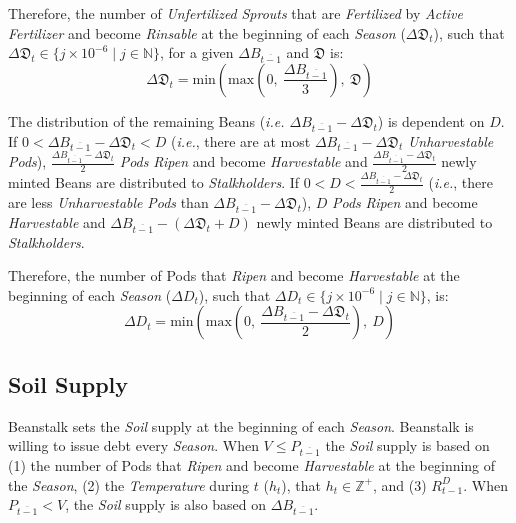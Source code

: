 \documentclass[tikz]{article}
\newcommand{\term}[1]{\textsl{#1}}
\begin{document}
Therefore, the number of \term{Unfertilized} \term{Sprouts} that are \term{Fertilized} by \term{Active} \term{Fertilizer} and become \term{Rinsable} at the beginning of each \term{Season} ($\Delta \mathfrak{D}_t$), such that $\Delta \mathfrak{D}_t \in \{j \times 10^{-6} \mid j \in \mathbb{N} \}$, for a given $\Delta B_{\overline{t-1}}$ and $\mathfrak{D}$ is:
$$\Delta \mathfrak{D}_t = \text{min}\left(\text{max}\left(0,\ \frac{\Delta B_{\overline{t-1}}}{3}\right),\ \mathfrak{D}\right)$$

\newpage
The distribution of the remaining Beans (\term{i.e. $\Delta B_{\overline{t-1}} - \Delta \mathfrak{D}_t$}) is dependent on $D$. If $0 < \Delta B_{\overline{t-1}} - \Delta \mathfrak{D}_t < D$ (\term{i.e.}, there are at most $\Delta B_{\overline{t-1}} - \Delta \mathfrak{D}_t$ \term{Unharvestable} \term{Pods}), $\frac{\Delta B_{\overline{t-1}} - \Delta \mathfrak{D}_t}{2}$ \term{Pods} \term{Ripen} and become \term{Harvestable} and $\frac{\Delta B_{\overline{t-1}} - \Delta \mathfrak{D}_t}{2}$ newly minted Beans are distributed to \term{Stalkholders}. If $0 < D < \frac{\Delta B_{\overline{t-1}} - \Delta \mathfrak{D}_t}{2}$ (\term{i.e.}, there are less \term{Unharvestable} \term{Pods} than $\Delta B_{\overline{t-1}} - \Delta \mathfrak{D}_t$), $D$ \term{Pods} \term{Ripen} and become \term{Harvestable} and $\Delta B_{\overline{t-1}} - (\Delta \mathfrak{D}_t + D)$ newly minted Beans are distributed to \term{Stalkholders}.

Therefore, the number of Pods that \term{Ripen} and become \term{Harvestable} at the beginning of each \term{Season} ($\Delta D_t$), such that $\Delta D_t \in \{j \times 10^{-6} \mid j \in \mathbb{N} \}$, is:
\vspace*{1mm}
$$\Delta D_t = \text{min}\left(\text{max}\left(0,\ \frac{\Delta B_{\overline{t-1}} - \Delta \mathfrak{D}_t}{2}\right),\ D\right)$$

\subsection{Soil Supply}
\vspace*{1mm}
Beanstalk sets the \term{Soil} supply at the beginning of each \term{Season}. Beanstalk is willing to issue debt every \term{Season}. When $V \leq P_{\overline{t-1}}$ the \term{Soil} supply is based on (1) the number of Pods that \term{Ripen} and become \term{Harvestable} at the beginning of the \term{Season}, (2) the \term{Temperature} during $t$ ($h_t$), that $h_t \in \mathbb{Z}^{+}$, and (3) $R^D_{t-1}$. When $P_{\overline{t-1}} < V$, the \term{Soil} supply is also based on $\Delta B_{\overline{t-1}}$.
\end{document}
